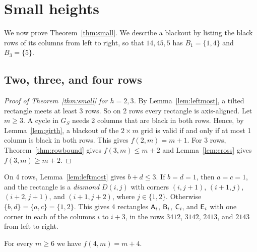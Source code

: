\section{Small heights}\label{sec:small}

We now prove Theorem~\ref{thm:small}. We describe a blackout by listing the black rows of
its columns from left to right, so that $14,45,5$ has $B_1=\{1,4\}$ and $B_3=\{5\}$.

\subsection{Two, three, and four rows}

\begin{proof}[Proof of Theorem~\ref{thm:small} for $h=2,3$]
By Lemma~\ref{lem:leftmost}, a tilted rectangle meets at least 3 rows. So on 2 rows every
rectangle is axis-aligned. Let $m\ge3$. A cycle in $G_S$ needs 2 columns that are black in
both rows. Hence, by Lemma~\ref{lem:girth}, a blackout of the $2\times m$ grid is valid if
and only if at most 1 column is black in both rows. This gives $f(2,m)=m+1$. For 3 rows,
Theorem~\ref{thm:rowbound} gives $f(3,m)\le m+2$ and Lemma~\ref{lem:cross} gives
$f(3,m)\ge m+2$.
\end{proof}

On 4 rows, Lemma~\ref{lem:leftmost} gives $b+d\le3$. If $b=d=1$, then $a=c=1$, and the
rectangle is a \emph{diamond} $D(i,j)$ with corners $(i,j+1)$, $(i+1,j)$, $(i+2,j+1)$, and
$(i+1,j+2)$, where $j\in\{1,2\}$. Otherwise $\{b,d\}=\{a,c\}=\{1,2\}$. This gives 4
rectangles $\mathsf{A}_i$, $\mathsf{B}_i$, $\mathsf{C}_i$, and $\mathsf{E}_i$ with one corner in each of the columns
$i$ to $i+3$, in the rows $3412$, $3142$, $2413$, and $2143$ from left to right.

\begin{proposition}\label{prop:four}
For every $m\ge6$ we have $f(4,m)=m+4$.
\end{proposition}

